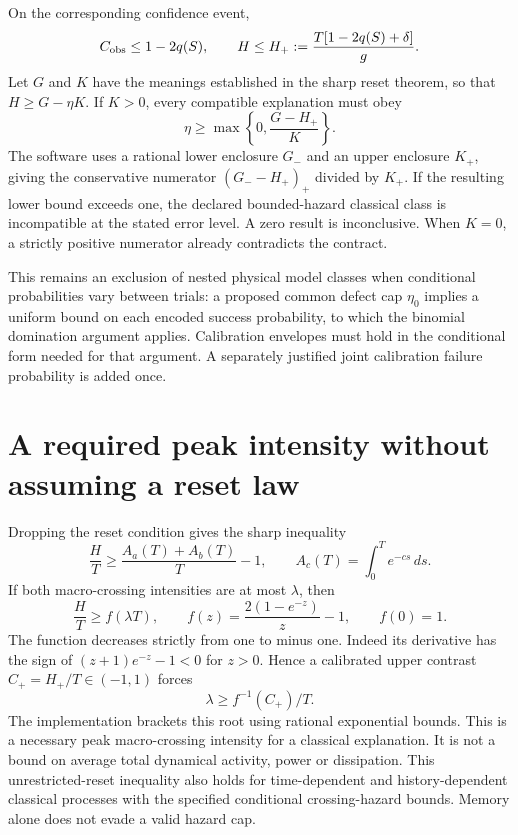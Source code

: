 On the corresponding confidence event,
\[
 C_{\rm obs}\leq1-2q(S),\qquad
 H\leq H_+:=\frac{T[1-2q(S)+\delta]}{g}.
\]
Let $G$ and $K$ have the meanings established in the sharp reset theorem,
so that $H\geq G-\eta K$. If $K>0$, every compatible explanation must obey
\begin{equation}\label{rr:eta-inference}
 \eta\geq\max\left\{0,\frac{G-H_+}{K}\right\}.
\end{equation}
The software uses a rational lower enclosure $G_-$ and an upper enclosure
$K_+$, giving the conservative numerator $(G_--H_+)_+$ divided by $K_+$.
If the resulting lower bound exceeds one, the declared bounded-hazard
classical class is incompatible at the stated error level. A zero result
is inconclusive. When $K=0$, a strictly positive numerator already contradicts
the contract.

This remains an exclusion of nested physical model classes when conditional
probabilities vary between trials: a proposed common defect cap $\eta_0$
implies a uniform bound on each encoded success probability, to which the
binomial domination argument applies. Calibration envelopes must hold in the
conditional form needed for that argument. A separately justified joint
calibration failure probability is added once.

\section{A required peak intensity without assuming a reset law}
Dropping the reset condition gives the sharp inequality
\[
 \frac HT\geq\frac{A_a(T)+A_b(T)}T-1,
 \qquad A_c(T)=\int_0^T e^{-cs}\,ds.
\]
If both macro-crossing intensities are at most $\lambda$, then
\[
 \frac HT\geq f(\lambda T),\qquad
 f(z)=\frac{2(1-e^{-z})}{z}-1,
 \qquad f(0)=1.
\]
The function decreases strictly from one to minus one. Indeed its derivative
has the sign of $(z+1)e^{-z}-1<0$ for $z>0$. Hence a calibrated upper
contrast $C_+=H_+/T\in(-1,1)$ forces
\[
 \lambda\geq f^{-1}(C_+)/T.
\]
The implementation brackets this root using rational exponential bounds.
This is a necessary peak macro-crossing intensity for a classical explanation.
It is not a bound on average total dynamical activity, power or dissipation.
This unrestricted-reset inequality also holds for time-dependent and
history-dependent classical processes with the specified conditional
crossing-hazard bounds. Memory alone does not evade a valid hazard cap.

